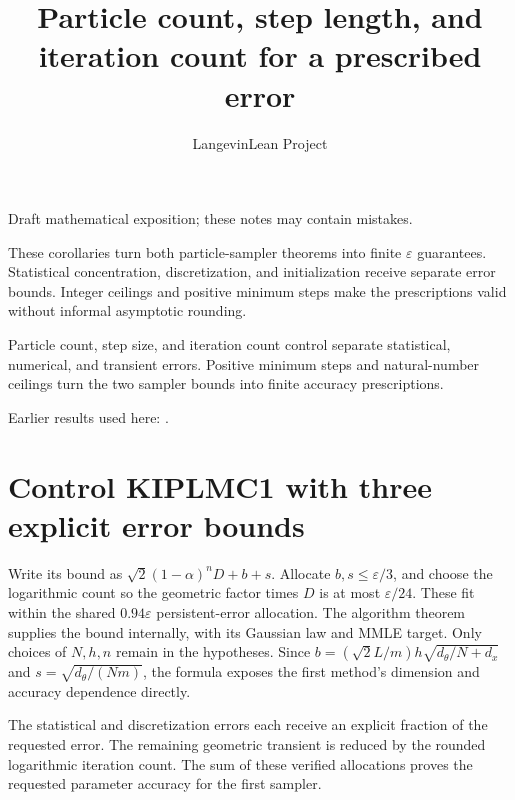\documentclass[11pt,a4paper]{article}
\title{\texorpdfstring{Particle count, step length, and iteration count for a prescribed error}{Particle count, step length, and iteration count for a prescribed error}}
\author{LangevinLean Project}
\date{}
\begin{document}
\maketitle
Draft mathematical exposition; these notes may contain mistakes.


These corollaries turn both particle-sampler theorems into finite \(\varepsilon\) guarantees. Statistical concentration, discretization, and initialization receive separate error bounds. Integer ceilings and positive minimum steps make the prescriptions valid without informal asymptotic rounding.



Particle count, step size, and iteration count control separate statistical, numerical, and transient errors. Positive minimum steps and natural-number ceilings turn the two sampler bounds into finite accuracy prescriptions.



Earlier results used here: \cite[Section~3.99]{LangevinLean2026Kinetic}.

\section{\texorpdfstring{Control KIPLMC1 with three explicit error bounds}{Control KIPLMC1 with three explicit error bounds}}


Write its bound as \(\sqrt2(1-\alpha)^nD+b+s\). Allocate \(b,s\le\varepsilon/3\), and choose the logarithmic count so the geometric factor times \(D\) is at most \(\varepsilon/24\). These fit within the shared \(0.94\varepsilon\) persistent-error allocation. The algorithm theorem supplies the bound internally, with its Gaussian law and MMLE target. Only choices of \(N,h,n\) remain in the hypotheses. Since \(b=(\sqrt2 L/m)h\sqrt{d_\theta/N+d_x}\) and \(s=\sqrt{d_\theta/(Nm)}\), the formula exposes the first method’s dimension and accuracy dependence directly.



The statistical and discretization errors each receive an explicit fraction of the requested error. The remaining geometric transient is reduced by the rounded logarithmic iteration count. The sum of these verified allocations proves the requested parameter accuracy for the first sampler.
\end{document}

